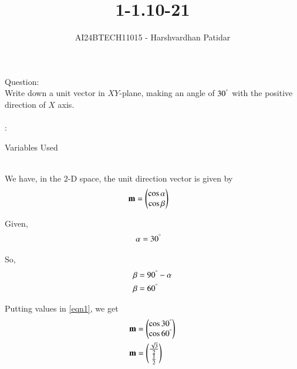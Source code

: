 \documentclass[journal]{IEEEtran}
\begin{document}

\vspace{3cm}

\title{1-1.10-21}
\author{AI24BTECH11015 - Harshvardhan Patidar}
 \maketitle
{\let\newpage\relax\maketitle}

\renewcommand{\thefigure}{\theenumi}
\renewcommand{\thetable}{\theenumi}
\setlength{\intextsep}{10pt} %


\renewcommand{\thetable}{\theenumi}

Question: \\
	Write down a unit vector in $XY$-plane, making an angle of $30^{\degree}$ with the positive direction of $X$ axis. \\ \\

\solution: \\
		\begin{table}[h!]    
  			\centering
  			
  			\caption{Variables Used}
  			\label{tab1-1.10-21}
		\end{table}\\


	We have, in the $2$-D space, the unit direction vector is given by
	\begin{align}
		\mathbf{m} &= \begin{pmatrix}\cos \alpha \\ \cos \beta\end{pmatrix}
	\end{align}

	Given, 
	\begin{align}
		\alpha &= 30^{\degree} \label{eqn1}
	\end{align}

	So,
	\begin{align}
		\beta &= 90^{\degree} - \alpha\\
		\beta &= 60^{\degree}
	\end{align}

	Putting values in \eqref{eqn1}, we get
	\begin{align}
		\mathbf{m} &= \begin{pmatrix}\cos 30^{\degree} \\ \cos 60^{\degree}\end{pmatrix}\\
		\mathbf{m} &= \begin{pmatrix}\frac{\sqrt{3}}{2} \\ \frac{1}{2}\end{pmatrix}\\	
	\end{align}
\end{document}
